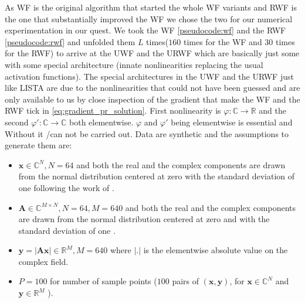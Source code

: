 As \ac{WF} is the original algorithm that started the whole \ac{WF} variants and \ac{RWF} is the one that substantially 
improved the \ac{WF} we chose the two for our numerical experimentation in our \du quest. We took the \ac{WF}\cite{Candes2014} 
\cref{pseudocode:wf} and the \ac{RWF}\cite{Zhang2016} 
\cref{pseudocode:rwf} and unfolded them $L$ times($160$ times for the \ac{WF} and $30$ times for 
the \ac{RWF}) to arrive at the \ac{UWF} and the \ac{URWF} which are basically 
just some \nn\cite{Goodfellow2016}\cite{Bishop2006}\index{\nn} 
with some special architecture (innate nonlinearities replacing the usual activation functions). The special architectures in the \ac{UWF} and the \ac{URWF} 
just like \ac{LISTA} are due to the nonlinearities that could not have been guessed and are only available to us by close inspection of the gradient that make 
the \ac{WF} and the \ac{RWF} tick in \cref{eq:gradient_pr_solution}. First nonlinearity is $\varphi \colon \mathbb{C} \rightarrow \mathbb{R}$ and the second $\varphi' \colon \mathbb{C} \rightarrow \mathbb{C}$ both elementwise. 
$\varphi$ and $\varphi'$ being elementwise is essential and Without it \ml/\dl can not be carried out. 
Data are synthetic and the assumptions to generate them are:
\begin{itemize}
  \item $\boldsymbol{x} \in \mathbb{C}^{N}, N=64$ and both the real and the complex components are drawn from the normal distribution 
  centered at zero with the standard deviation of one following the work of \cite{Naimipour2020}\cite{Naimipour2020a}.
  \item $\boldsymbol{A} \in \mathbb{C}^{M \times N}, N=64, M=640$ and both the real and the complex components are drawn from the normal distribution 
  centered at zero and with the standard deviation of one \cite{Naimipour2020}\cite{Naimipour2020a}.
  \item $\boldsymbol{y}= \left|\boldsymbol{A}\boldsymbol{x}\right| \in \mathbb{R}^M, M=640$ where $\left|\boldsymbol{.}\right|$ is the elementwise absolute value on the complex field.
  \item $P=100$ for number of sample points ($100$ pairs of $(\boldsymbol{x},\boldsymbol{y})$, for $\boldsymbol{x} \in \mathbb{C}^N$ and $\boldsymbol{y} \in \mathbb{R}^M$ ).
\end{itemize}

